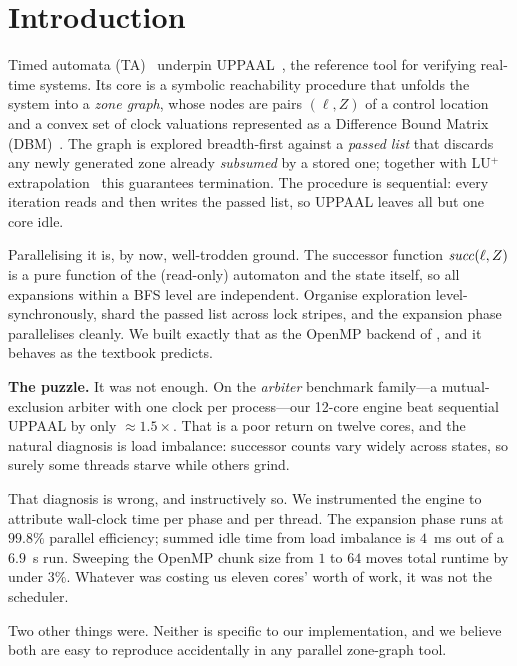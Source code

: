 \section{Introduction}\label{sec:intro}

Timed automata (TA)~\cite{AlurDill94} underpin \textsc{UPPAAL}~\cite{Larsen97},
the reference tool for verifying real-time systems.  Its core is a symbolic
reachability procedure that unfolds the system into a \emph{zone graph}, whose
nodes are pairs $(\ell, Z)$ of a control location and a convex set of clock
valuations represented as a Difference Bound Matrix (DBM)~\cite{Dill89}.  The
graph is explored breadth-first against a \emph{passed list} that discards any
newly generated zone already \emph{subsumed} by a stored one; together with
LU$^+$ extrapolation~\cite{Behrmann06} this guarantees termination.  The
procedure is sequential: every iteration reads and then writes the passed list,
so UPPAAL leaves all but one core idle.

Parallelising it is, by now, well-trodden ground.  The successor function
$\mathit{succ}(\ell,Z)$ is a pure function of the (read-only) automaton and the state
itself, so all expansions within a BFS level are independent.  Organise
exploration level-synchronously, shard the passed list across lock stripes, and
the expansion phase parallelises cleanly.  We built exactly that as the OpenMP
backend of \tool{}, and it behaves as the textbook predicts.

\medskip
\noindent\textbf{The puzzle.}  It was not enough.  On the \emph{arbiter}
benchmark family---a mutual-exclusion arbiter with one clock per process---our
12-core engine beat sequential UPPAAL by only $\approx 1.5\times$.  That is a
poor return on twelve cores, and the natural diagnosis is load imbalance:
successor counts vary widely across states, so surely some threads starve while
others grind.

That diagnosis is wrong, and instructively so.  We instrumented the engine to
attribute wall-clock time per phase and per thread.  The expansion phase runs at
$99.8\%$ parallel efficiency; summed idle time from load imbalance is $4$~ms out
of a $6.9$~s run.  Sweeping the OpenMP chunk size from $1$ to $64$ moves total
runtime by under $3\%$.  Whatever was costing us eleven cores' worth of work, it
was not the scheduler.

Two other things were.  Neither is specific to our implementation, and we
believe both are easy to reproduce accidentally in any parallel zone-graph tool.

